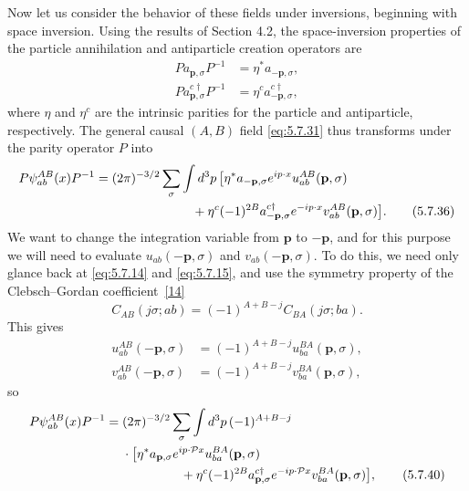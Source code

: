 Now let us consider the behavior of these fields under inversions, beginning
with space inversion. Using the results of Section 4.2, the space-inversion
properties of the particle annihilation and antiparticle creation operators
are
\begin{align}
P a_{\mathbf p,\sigma}P^{-1}&=\eta^*a_{-\mathbf p,\sigma},
\tag{5.7.34}\label{eq:5.7.34}\\
P a^{c\dagger}_{\mathbf p,\sigma}P^{-1}&=\eta^c
a^{c\dagger}_{-\mathbf p,\sigma},
\tag{5.7.35}\label{eq:5.7.35}
\end{align}
where $\eta$ and $\eta^c$ are the intrinsic parities for the particle and
antiparticle, respectively. The general causal $(A,B)$ field \eqref{eq:5.7.31} thus
transforms under the parity operator $P$ into
\begin{align}
P\psi^{AB}_{ab}(x)P^{-1}={}&(2\pi)^{-3/2}\sum_\sigma\int d^3p\,
\bigl[\eta^*a_{-\mathbf p,\sigma}e^{ip\cdot x}u^{AB}_{ab}(\mathbf p,\sigma)
\notag\\
&\hspace{22mm}+\eta^c(-1)^{2B}a^{c\dagger}_{-\mathbf p,\sigma}e^{-ip\cdot x}
v^{AB}_{ab}(\mathbf p,\sigma)\bigr].
\tag{5.7.36}\label{eq:5.7.36}
\end{align}
We want to change the integration variable from $\mathbf p$ to $-\mathbf p$,
and for this purpose we will need to evaluate $u_{ab}(-\mathbf p,\sigma)$ and
$v_{ab}(-\mathbf p,\sigma)$. To do this, we need only glance back at \eqref{eq:5.7.14}
and \eqref{eq:5.7.15}, and use the symmetry property of the Clebsch--Gordan
coefficient~\hyperref[ref:5.14]{[14]}
\begin{equation}
C_{AB}(j\sigma;ab)=(-1)^{A+B-j}C_{BA}(j\sigma;ba).
\tag{5.7.37}\label{eq:5.7.37}
\end{equation}
This gives
\begin{align}
u^{AB}_{ab}(-\mathbf p,\sigma)&=(-1)^{A+B-j}u^{BA}_{ba}(\mathbf p,\sigma),
\tag{5.7.38}\label{eq:5.7.38}\\
v^{AB}_{ab}(-\mathbf p,\sigma)&=(-1)^{A+B-j}v^{BA}_{ba}(\mathbf p,\sigma),
\tag{5.7.39}\label{eq:5.7.39}
\end{align}
so
\begin{align}
P\psi^{AB}_{ab}(x)P^{-1}={}&(2\pi)^{-3/2}\sum_\sigma\int d^3p\,
(-1)^{A+B-j}
\notag\\
&\cdot\bigl[\eta^*a_{\mathbf p,\sigma}e^{ip\cdot\mathcal P x}
u^{BA}_{ba}(\mathbf p,\sigma)
\notag\\
&\hspace{16mm}+\eta^c(-1)^{2B}a^{c\dagger}_{\mathbf p,\sigma}
e^{-ip\cdot\mathcal P x}v^{BA}_{ba}(\mathbf p,\sigma)\bigr],
\tag{5.7.40}\label{eq:5.7.40}
\end{align}
